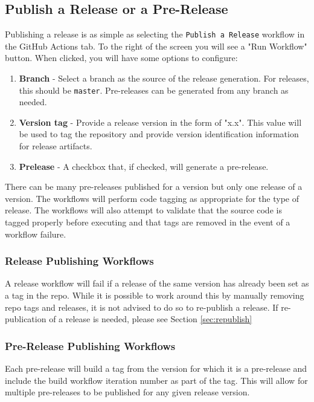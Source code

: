 \subsection{Publish a Release or a Pre-Release}

Publishing a release is as simple as selecting the \texttt{Publish a Release}
workflow in the GitHub Actions tab.  To the right of the screen you will see
a "Run Workflow" button.  When clicked, you will have some options to configure:

\begin{enumerate}
    \item \textbf{Branch} - Select a branch as the source of the release generation.  For
    releases, this should be \texttt{master}.  Pre-releases can be generated from
    any branch as needed.
    \item \textbf{Version tag} - Provide a release version in the form of "x.x".  This value
    will be used to tag the repository and provide version identification information
    for release artifacts.
    \item \textbf{Prelease} - A checkbox that, if checked, will generate a pre-release.
\end{enumerate}

There can be many pre-releases published for a version but only one release of a version.
The workflows will perform code tagging as appropriate for the type of release.  The
workflows will also attempt to validate that the source code is tagged properly before
executing and that tags are removed in the event of a workflow failure.

\subsubsection{Release Publishing Workflows}

A release workflow will fail if a release of the same version has already been
set as a tag in the repo.  While it is possible to work around this by manually
removing repo tags and releases, it is not advised to do so to re-publish a release.
If re-publication of a release is needed, please see Section \ref{sec:republish}


\subsubsection{Pre-Release Publishing Workflows}

Each pre-release will build a tag from the version for which it is a pre-release
and include the build workflow iteration number as part of the tag.  This will allow
for multiple pre-releases to be published for any given release version.

